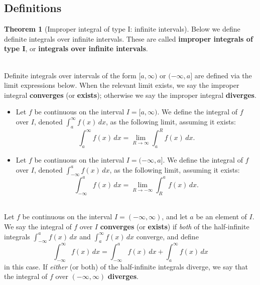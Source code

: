 \documentclass[11pt]{article}
\theoremstyle{definition}
\theoremstyle{named}
\newtheorem*{namedtheorem}{Theorem}
\numberwithin{myalgctr}{section}
\begin{document}
\thispagestyle{fancy}
\subsection*{Definitions}
\begin{namedtheorem}[Improper integral of type I: infinite intervals] Below we define definite integrals over infinite intervals. These are called {\bf improper integrals of type I}, or {\bf integrals over infinite intervals}.
\begin{description}[topsep=0pt, itemsep=0pt]
  \item[Half-infinite intervals]\ \\ Definite integrals over intervals of the form $[a,\infty)$ or $(-\infty, a]$ are defined via the limit expressions below. When the relevant limit exists, we say the improper integral {\bf converges} (or {\bf exists}); otherwise we say the improper integral {\bf diverges}.
  \begin{itemize}[topsep=0pt, itemsep=0pt]
    \item Let $f$ be continuous on the interval $I=[a,\infty)$. We define the integral of $f$ over $I$, denoted $\displaystyle\int_a^\infty f(x)\, dx$, as the following limit, assuming it exists:
    \[
    \int_a^\infty f(x)\, dx=\lim_{R\to\infty}\int_a^R f(x)\, dx.
    \]
    \item Let $f$ be continuous on the interval $I=(-\infty,a]$. We define the integral of $f$ over $I$, denoted $\displaystyle\int_{-\infty}^a f(x)\, dx$, as the following limit, assuming it exists:
    \[
    \int_{-\infty}^af(x)\, dx=\lim_{R\to-\infty}\int_R^{a} f(x)\, dx.
    \]
  \end{itemize}
  \item[Real line]\ \\ Let $f$ be continuous on the interval $I=(-\infty,\infty)$, and let $a$ be an element of $I$. We say the integral of $f$ over $I$ {\bf converges} (or {\bf exists}) if {\em both} of the half-infinite integrals $\displaystyle\int_{-\infty}^a f(x)\, dx$ and $\displaystyle\int_a^{\infty}f(x)\, dx$ converge, and define
  \[
  \int_{-\infty}^\infty f(x)\, dx=\int_{-\infty}^a f(x)\, dx+\int_a^{\infty}f(x)\, dx
  \]
  in this case. If {\em either} (or both) of the half-infinite integrals diverge, we say that the integral of $f$ over $(-\infty, \infty)$ {\bf diverges}.
\end{description}
\end{namedtheorem}
\end{document}
